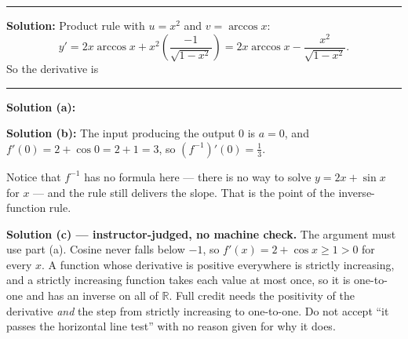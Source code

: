 \documentclass[12pt]{article}
\begin{document}
\vspace{0.15cm}\noindent\rule{\linewidth}{0.2pt}\vspace{0.15cm}


\textbf{Solution:} Product rule with $u = x^2$ and $v = \arccos x$:
\[
  y' = 2x\arccos x + x^2\left(\frac{-1}{\sqrt{1-x^2}}\right)
     = 2x\arccos x - \frac{x^2}{\sqrt{1-x^2}}.
\]
So the derivative is 

\vspace{0.15cm}\noindent\rule{\linewidth}{0.2pt}\vspace{0.15cm}


\textbf{Solution (a):} 

\textbf{Solution (b):} The input producing the output $0$ is $a = 0$, and
$f'(0) = 2 + \cos 0 = 2 + 1 = 3$, so
$\left(f^{-1}\right)'(0) = \frac{1}{3}$. 

Notice that $f^{-1}$ has no formula here --- there is no way to solve
$y = 2x + \sin x$ for $x$ --- and the rule still delivers the slope. That is the
point of the inverse-function rule.

\textbf{Solution (c) --- instructor-judged, no machine check.} The argument must
use part (a). Cosine never falls below $-1$, so $f'(x) = 2 + \cos x \ge 1 > 0$
for every $x$. A function whose derivative is positive everywhere is strictly
increasing, and a strictly increasing function takes each value at most once, so
it is one-to-one and has an inverse on all of $\mathbb{R}$. Full credit needs the
positivity of the derivative \emph{and} the step from strictly increasing to
one-to-one. Do not accept ``it passes the horizontal line test'' with no reason
given for why it does.
\end{document}
